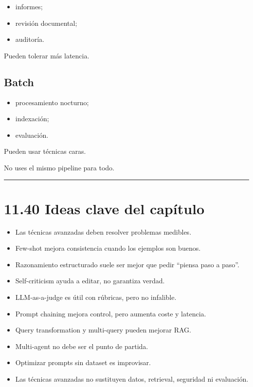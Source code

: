 \begin{itemize}
\tightlist
\item
  informes;
\item
  revisión documental;
\item
  auditoría.
\end{itemize}

Pueden tolerar más latencia.

\subsection{Batch}\label{batch}

\begin{itemize}
\tightlist
\item
  procesamiento nocturno;
\item
  indexación;
\item
  evaluación.
\end{itemize}

Pueden usar técnicas caras.

No uses el mismo pipeline para todo.

\begin{center}\rule{0.5\linewidth}{0.5pt}\end{center}

\section{11.40 Ideas clave del
capítulo}\label{ideas-clave-del-capuxedtulo-10}

\begin{itemize}
\tightlist
\item
  Las técnicas avanzadas deben resolver problemas medibles.
\item
  Few-shot mejora consistencia cuando los ejemplos son buenos.
\item
  Razonamiento estructurado suele ser mejor que pedir ``piensa paso a
  paso''.
\item
  Self-criticism ayuda a editar, no garantiza verdad.
\item
  LLM-as-a-judge es útil con rúbricas, pero no infalible.
\item
  Prompt chaining mejora control, pero aumenta coste y latencia.
\item
  Query transformation y multi-query pueden mejorar RAG.
\item
  Multi-agent no debe ser el punto de partida.
\item
  Optimizar prompts sin dataset es improvisar.
\item
  Las técnicas avanzadas no sustituyen datos, retrieval, seguridad ni
  evaluación.
\end{itemize}

